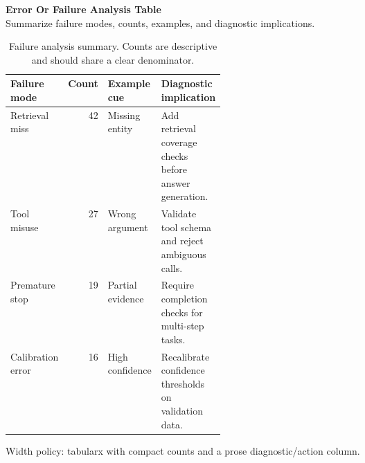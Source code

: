 \documentclass[10pt]{article}
\begin{document}
{\large\textbf{Error Or Failure Analysis Table}}\\[-0.05em]
{\footnotesize\textcolor{GroupText}{Summarize failure modes, counts, examples, and diagnostic implications.}}\\[0.35em]
\begin{table}[H]
\centering
\caption{Failure analysis summary. Counts are descriptive and should share a clear denominator.}
\label{tab:failure-analysis}
\small
\begin{tabularx}{\linewidth}{@{}L{0.18\linewidth}rL{0.18\linewidth}Y@{}}
\toprule
{}
\textbf{Failure mode} & \textbf{Count} & \textbf{Example cue} & \textbf{Diagnostic implication} \\
\midrule
Retrieval miss & 42 & Missing entity & Add retrieval coverage checks before answer generation. \\
Tool misuse & 27 & Wrong argument & Validate tool schema and reject ambiguous calls. \\
Premature stop & 19 & Partial evidence & Require completion checks for multi-step tasks. \\
Calibration error & 16 & High confidence & Recalibrate confidence thresholds on validation data. \\
\bottomrule
\end{tabularx}
\end{table}
\vfill
{\footnotesize\textcolor{GroupText}{Width policy: tabularx with compact counts and a prose diagnostic/action column.}}
\end{document}
